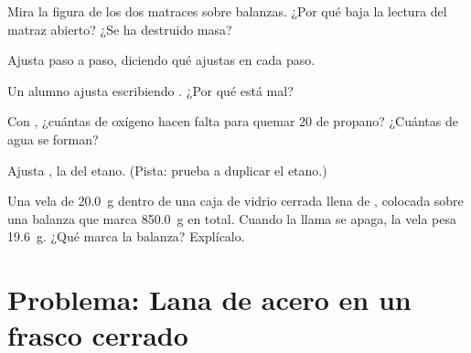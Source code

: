 \begin{exercise}[$\star\star$]\label{exo:g8:balanced-equations:7}
Mira la figura de los dos matraces sobre balanzas. ¿Por qué baja la
lectura del matraz abierto? ¿Se ha destruido masa?
\end{exercise}

\begin{exercise}[$\star\star$]\label{exo:g8:balanced-equations:8}
Ajusta  paso a paso, diciendo qué  %
ajustas en cada paso.
\end{exercise}

\begin{exercise}[$\star\star$]\label{exo:g8:balanced-equations:9}
Un alumno ajusta  escribiendo . %
¿Por qué está mal?
\end{exercise}

\begin{exercise}[$\star\star$]\label{exo:g8:balanced-equations:10}
Con , ¿cuántas  de oxígeno hacen
falta para quemar 20  de propano? ¿Cuántas  de agua se
forman?
\end{exercise}

\begin{exercise}[$\star\star\star$]\label{exo:g8:balanced-equations:11}
Ajusta , la  del etano. (Pista: %
prueba a duplicar el etano.)
\end{exercise}

\begin{exercise}[$\star\star\star$]\label{exo:g8:balanced-equations:12}
Una vela de \qty{20.0}{g}  dentro de una caja de vidrio cerrada
llena de , colocada sobre una balanza que marca \qty{850.0}{g} en
total. Cuando la llama se apaga, la vela pesa \qty{19.6}{g}. ¿Qué marca
la balanza? Explícalo.
\end{exercise}

\section{Problema: Lana de acero en un frasco cerrado}

